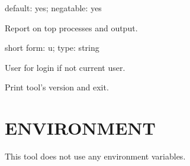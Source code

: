 \documentclass[letterpaper,10pt,english]{sphinxmanual}
\begin{document}
\begin{fulllineitems}
\label{\detokenize{mariadb-summary:cmdoption-mariadb-summary-summarize-processes}}
default: yes; negatable: yes

Report on top processes and  output.

\end{fulllineitems}


\begin{fulllineitems}
\label{\detokenize{mariadb-summary:cmdoption-mariadb-summary-user}}
short form: \sphinxhyphen{}u; type: string

User for login if not current user.

\end{fulllineitems}


\begin{fulllineitems}
\label{\detokenize{mariadb-summary:cmdoption-mariadb-summary-version}}
Print tool’s version and exit.

\end{fulllineitems}



\section{ENVIRONMENT}
\label{\detokenize{mariadb-summary:environment}}
This tool does not use any environment variables.
\end{document}

